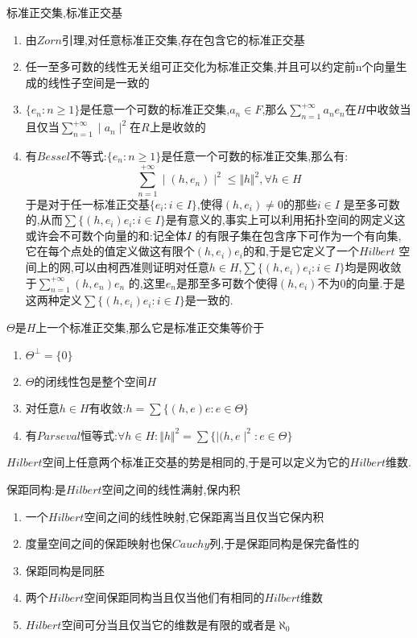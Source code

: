 标准正交集,标准正交基
\begin{enumerate}
  \item 由$Zorn$引理,对任意标准正交集,存在包含它的标准正交基
  \item 任一至多可数的线性无关组可正交化为标准正交集,并且可以约定前n个向量生成的线性子空间是一致的
  \item $\{e_n:n\ge1\}$是任意一个可数的标准正交集,$a_n\in F$,那么$\sum_{n=1}^{+\infty}a_ne_n$在$H$中收敛当且仅当$\sum_ {n=1}^{+\infty}\mid a_n\mid^2$在$R$上是收敛的
  \item 有$Bessel$不等式:$\{e_n:n\ge1\}$是任意一个可数的标准正交集,那么有:
  $$\sum_{n=1}^{+\infty}\mid(h,e_n)\mid^2\le\Vert h\Vert^2,\forall h\in H$$
  于是对于任一标准正交基$\{e_i:i\in I\}$,使得$(h,e_i)\not=0$的那些$i\in I$ 是至多可数的,从而$\sum\{(h,e_i)e_i:i\in I\}$是有意义的,事实上可以利用拓扑空间的网定义这或许会不可数个向量的和:记全体$I$ 的有限子集在包含序下可作为一个有向集,它在每个点处的值定义做这有限个$(h,e_i)e_i$的和,于是它定义了一个$Hilbert$ 空间上的网,可以由柯西准则证明对任意$h\in H$,$\sum\{(h,e_i)e_i:i\in I\}$均是网收敛于$\sum_ {n=1}^{+\infty}(h,e_n)e_n$
  的,这里$e_n$是那至多可数个使得$(h,e_i)$不为0的向量.于是这两种定义$\sum\{(h,e_i)e_i:i\in I\}$是一致的.
\end{enumerate}

$\Theta$是$H$上一个标准正交集,那么它是标准正交集等价于
\begin{enumerate}
  \item $\Theta^{\perp}=\{0\}$
  \item $\Theta$的闭线性包是整个空间$H$
  \item 对任意$h\in H$有收敛:$h=\sum\{(h,e)e:e\in\Theta\}$
  \item 有$Parseval$恒等式:$\forall h\in H:\Vert h\Vert^2=\sum\{\mid(h,e\mid^2:e\in\Theta\}$
\end{enumerate}

$Hilbert$空间上任意两个标准正交基的势是相同的,于是可以定义为它的$Hilbert$维数.

保距同构:是$Hilbert$空间之间的线性满射,保内积
\begin{enumerate}
  \item 一个$Hilbert$空间之间的线性映射,它保距离当且仅当它保内积
  \item 度量空间之间的保距映射也保$Cauchy$列,于是保距同构是保完备性的
  \item 保距同构是同胚
  \item 两个$Hilbert$空间保距同构当且仅当他们有相同的$Hilbert$维数
  \item $Hilbert$空间可分当且仅当它的维数是有限的或者是$\aleph_0$
\end{enumerate}


